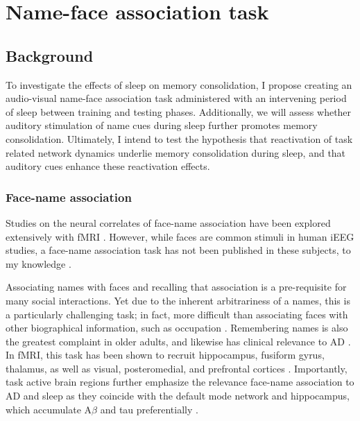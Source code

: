 %
%

\section*{Name-face association task}
\subsection*{Background}
To investigate the effects of sleep on memory consolidation, I propose creating an audio-visual name-face association task administered with an intervening period of sleep between training and testing phases. Additionally, we will assess whether auditory stimulation of name cues during sleep further promotes memory consolidation. Ultimately, I intend to test the hypothesis that reactivation of task related network dynamics underlie memory consolidation during sleep, and that auditory cues enhance these reactivation effects.

\subsubsection*{Face-name association}
Studies on the neural correlates of face-name association have been explored extensively with fMRI \citep{Sperling2001}. However, while faces are common stimuli in human iEEG studies, a face-name association task has not been published in these subjects, to my knowledge \citep{Quiroga2005, Mormann2015, Zheng2017}. 

Associating names with faces and recalling that association is a pre-requisite for many social interactions. Yet due to the inherent arbitrariness of a names, this is a particularly challenging task; in fact, more difficult than associating faces with other biographical information, such as occupation \citep{McWeeny1987, Rentz2011}. Remembering names is also the greatest complaint in older adults, and likewise has clinical relevance to AD \citep{Vannini2012}. In fMRI, this task has been shown to recruit hippocampus, fusiform gyrus, thalamus, as well as visual, posteromedial, and prefrontal cortices \citep{Sperling2001,Rentz2011}. Importantly, task active brain regions further emphasize the relevance face-name association to AD and sleep as they coincide with the default mode network and hippocampus, which accumulate A$\beta$ and tau preferentially \citep{Raichle2001, Buckner2005a, Pariente2005,Rentz2011, Vannini2012, Mander2015, Mander2016}.

